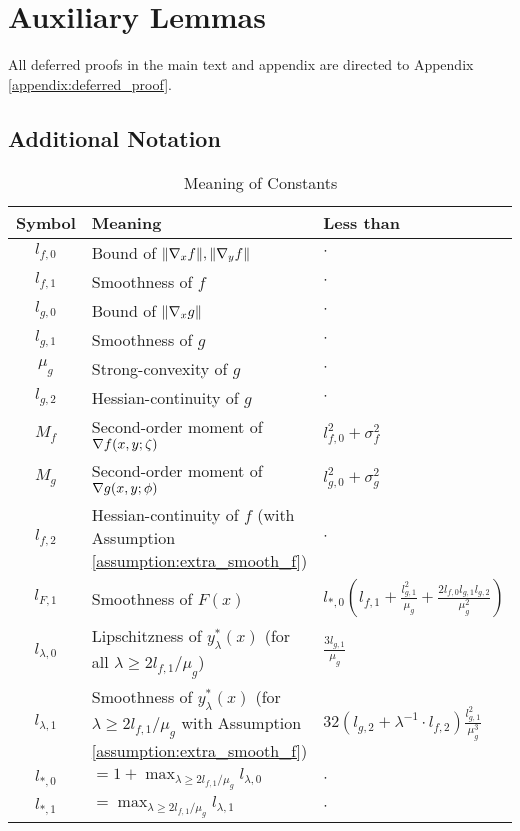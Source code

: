 

\section{Auxiliary Lemmas}
All deferred proofs in the main text and appendix are directed to Appendix \ref{appendix:deferred_proof}.

\subsection{Additional Notation}
\begin{table}[H]
    \centering
    \begin{tabular}{| c | l | l |}
        \hline
         \textrm{Symbol} & \textrm{Meaning} & \textrm{Less than} \\ \hline
         $l_{f,0}$ & Bound of $\|\nabla_x f\|, \|\nabla_y f\|$ & $\cdot$ \\ \hline
         $l_{f,1}$ & Smoothness of $f$ & $\cdot$ \\ \hline
         $l_{g,0}$ & Bound of $\|\nabla_x g\|$ & $\cdot$ \\ \hline
         $l_{g,1}$ & Smoothness of $g$ & $\cdot$ \\ \hline
         $\mu_g$ & Strong-convexity of $g$ & $\cdot$ \\ \hline
         $l_{g,2}$ & Hessian-continuity of $g$ & $\cdot$ \\ \hline
         $M_f$ & Second-order moment of $\nabla f(x,y;\zeta)$ & $l_{f,0}^2 + \sigma_f^2$ \\ \hline
         $M_g$ & Second-order moment of $\nabla g(x,y;\phi)$ & $l_{g,0}^2 + \sigma_g^2$ \\ \hline
         $l_{f,2}$ & Hessian-continuity of $f$ (with Assumption \ref{assumption:extra_smooth_f}) & $\cdot$ \\ \hline
         $l_{F,1}$ & Smoothness of $F(x)$ & $l_{*,0} \left(l_{f,1} + \frac{l_{g,1}^2}{\mu_g} + \frac{2l_{f,0}l_{g,1}l_{g,2}}{\mu_g^2} \right)$\\ \hline
         $l_{\lambda,0}$ & Lipschitzness of $y_\lambda^*(x)$ (for all $\lambda \ge 2l_{f,1}/\mu_g$) & $\frac{3 l_{g,1}}{\mu_g}$ \\ \hline
         $l_{\lambda,1}$ & Smoothness of $y_\lambda^*(x)$ (for $\lambda \ge 2l_{f,1}/\mu_g$ with Assumption \ref{assumption:extra_smooth_f}) & $32 (l_{g,2} + \lambda^{-1} \cdot l_{f,2}) \frac{l_{g,1}^2}{\mu_g^3}$ \\ \hline
         $l_{*,0}$ & $= 1 + \max_{\lambda \ge 2l_{f,1}/\mu_g}l_{\lambda,0}$ & $\cdot$ \\ \hline
         $l_{*,1}$ & $= \max_{\lambda \ge 2l_{f,1}/\mu_g} l_{\lambda, 1}$ & $\cdot$ \\ \hline
    \end{tabular}
    \caption{Meaning of Constants}
    \label{tab:constant_relations}
\end{table}
